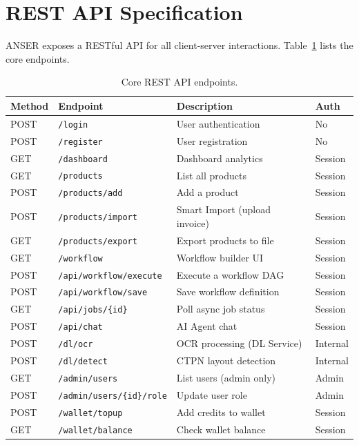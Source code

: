 \documentclass[11pt,a4paper]{report}
\begin{document}
\section{REST API Specification}
\label{sec:rest-api}

ANSER exposes a RESTful API for all client-server interactions. Table~\ref{tab:rest-api} lists the core endpoints.

\begin{table}[H]
\centering
\caption{Core REST API endpoints.}
\label{tab:rest-api}
\footnotesize
\begin{tabular}{llll}
\toprule
\textbf{Method} & \textbf{Endpoint} & \textbf{Description} & \textbf{Auth} \\
\midrule
POST & \texttt{/login}                    & User authentication          & No \\
POST & \texttt{/register}                 & User registration             & No \\
GET  & \texttt{/dashboard}                & Dashboard analytics           & Session \\
GET  & \texttt{/products}                 & List all products             & Session \\
POST & \texttt{/products/add}             & Add a product                 & Session \\
POST & \texttt{/products/import}          & Smart Import (upload invoice) & Session \\
GET  & \texttt{/products/export}          & Export products to file       & Session \\
GET  & \texttt{/workflow}                 & Workflow builder UI           & Session \\
POST & \texttt{/api/workflow/execute}     & Execute a workflow DAG        & Session \\
POST & \texttt{/api/workflow/save}        & Save workflow definition      & Session \\
GET  & \texttt{/api/jobs/\{id\}}         & Poll async job status         & Session \\
POST & \texttt{/api/chat}                 & AI Agent chat                 & Session \\
POST & \texttt{/dl/ocr}                   & OCR processing (DL Service)   & Internal \\
POST & \texttt{/dl/detect}                & CTPN layout detection         & Internal \\
GET  & \texttt{/admin/users}              & List users (admin only)       & Admin \\
POST & \texttt{/admin/users/\{id\}/role}  & Update user role              & Admin \\
POST & \texttt{/wallet/topup}             & Add credits to wallet         & Session \\
GET  & \texttt{/wallet/balance}           & Check wallet balance          & Session \\
\bottomrule
\end{tabular}
\end{table}
\end{document}
